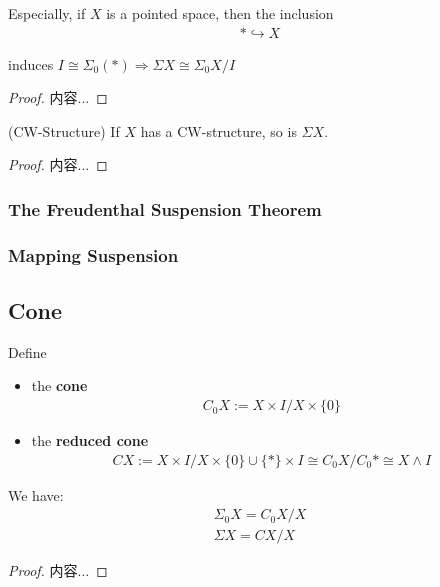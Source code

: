 \documentclass[Total.tex]{subfiles}
\begin{document}
				\begin{proposition}
					Especially, if $X$ is a pointed space, then the inclusion
					\begin{gather*}
						*\hookrightarrow X
					\end{gather*}
					
					induces $I\cong \Sigma_0(*)\Rightarrow \Sigma X\cong \Sigma_0 X/I$
				\end{proposition}
				\begin{proof}
					内容...
				\end{proof}
				
				\begin{proposition}
					(CW-Structure) If $X$ has a CW-structure, so is $\Sigma X$.
				\end{proposition}
				\begin{proof}
					内容...
				\end{proof}
				
				\subsubsection{The Freudenthal Suspension Theorem}
				\subsubsection{Mapping Suspension}
			\subsection{Cone}
				\begin{Def}
					Define
					\begin{itemize}
						\item the \textbf{cone}
						\begin{gather*}
							C_0X:=X\times I/X\times \{0\}
						\end{gather*}
						
						\item the \textbf{reduced cone}
						\begin{gather*}
							CX:=X\times I/X\times \{0\}\cup \{*\}\times I\cong C_0X/C_0*\cong X\wedge I
						\end{gather*}
					\end{itemize}
				\end{Def}
				
				\begin{proposition}
					We have:
					\begin{gather*}
						\Sigma_0 X=C_0X/X\\
						\Sigma X=CX/X
					\end{gather*}
				\end{proposition}
				\begin{proof}
					内容...
				\end{proof}
				
\end{document}
